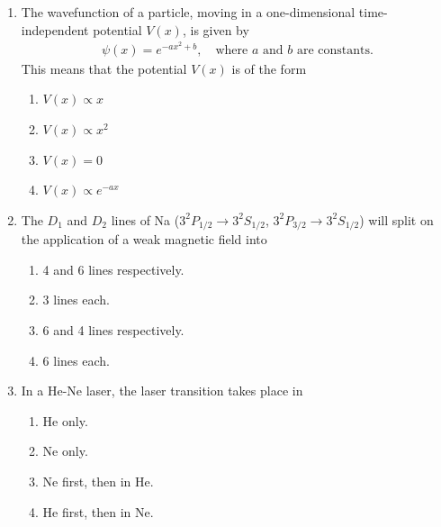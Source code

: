 \documentclass[journal,13pt,onecolumn]{IEEEtran}
\begin{document}
\begin{enumerate}[itemsep = 1em]
\item The wavefunction of a particle, moving in a one-dimensional time-independent potential $V(x)$, is given by
\begin{align*}
\psi(x) = e^{-ax^2 + b}, \quad \text{where $a$ and $b$ are constants.}
\end{align*}
This means that the potential $V(x)$ is of the form

\hfill{}


\begin{multicols}{2}
\begin{enumerate}
\item $V(x) \propto x$
\item $V(x) \propto x^2$
\item $V(x) = 0$
\item $V(x) \propto e^{-ax}$
\end{enumerate}
\end{multicols}


\item The $D_1$ and $D_2$ lines of Na ($3^2P_{1/2} \rightarrow 3^2S_{1/2}$, $3^2P_{3/2} \rightarrow 3^2S_{1/2}$) will split on the application of a weak magnetic field into

\hfill{}


\begin{multicols}{2}
\begin{enumerate}
\item 4 and 6 lines respectively.
\item 3 lines each.
\item 6 and 4 lines respectively.
\item 6 lines each.
\end{enumerate}
\end{multicols}


\item In a He-Ne laser, the laser transition takes place in

\hfill{}


\begin{multicols}{2}
\begin{enumerate}
\item He only.
\item Ne only.
\item Ne first, then in He.
\item He first, then in Ne.
\end{enumerate}
\end{multicols}



\end{enumerate}
\end{document}

